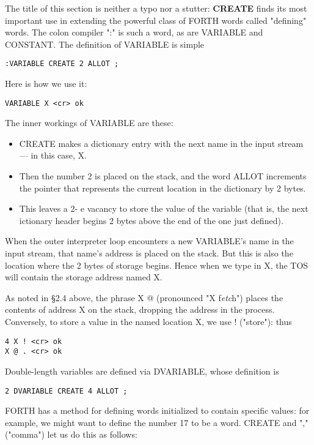 The title of this section is neither a typo nor a stutter: \textbf{CREATE} finds its most important use in extending the powerful class of FORTH words called "defining" words. The colon compiler ":" is such a word, as are VARIABLE and CONSTANT. The definition of VARIABLE is simple

\begin{lstlisting}
:VARIABLE CREATE 2 ALLOT ;
\end{lstlisting}

Here is how we use it:
\begin{lstlisting}
VARIABLE X <cr> ok
\end{lstlisting}

The inner workings of VARIABLE are these:
\begin{itemize}
    \item CREATE makes a dictionary entry with the next name in the input stream — in this case, X.
    \item Then the number 2 is placed on the stack, and the word ALLOT increments the pointer that represents the current location in the dictionary by 2 bytes.
    \item This leaves a 2- e vacancy to store the value of the variable (that is, the next ictionary header begins 2 bytes above the end of the one just defined).
\end{itemize}

When the outer interpreter loop encounters a new VARIABLE's name in the input stream, that name’s address is placed on the stack. But this is also the location where the 2 bytes of storage begins. Hence when we type in X, the TOS will contain the storage address named X.

As noted in §2.4 above, the phrase X @ (pronounced "X f\textit{etc}h") places the contents of address X on the stack, dropping the address in the process. Conversely, to store a value in the named location X, we use ! ("store"): thus
\begin{lstlisting}
4 X ! <cr> ok
X @ . <cr> ok
\end{lstlisting}

Double-length variables are defined via DVARIABLE, whose definition is

\begin{lstlisting}
2 DVARIABLE CREATE 4 ALLOT ;
\end{lstlisting}

FORTH has a method for defining words initialized to contain specific values: for example, we might want to define the number 17 to be a word. CREATE and "," ("comma") let us do this as follows:

